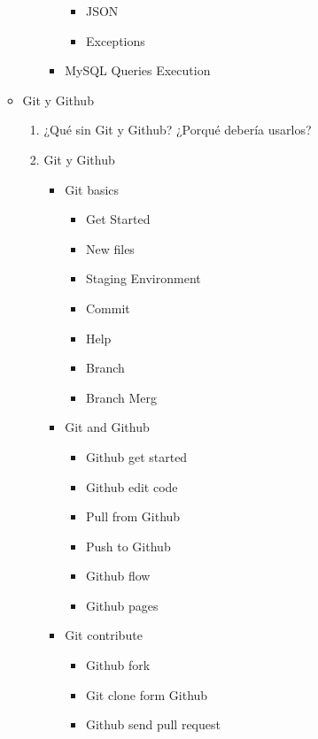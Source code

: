 \documentclass[12pt, letterpaper]{article}
\begin{document}
\begin{enumerate}
\begin{itemize}
\begin{enumerate}
\begin{itemize}
\begin{itemize}
                    \item JSON
                    \item Exceptions
                \end{itemize}
                \item MySQL Queries Execution
            \end{itemize}
        \end{enumerate}
        \item Git y Github
        \begin{enumerate}
            \item ¿Qué sin Git y Github? ¿Porqué debería usarlos?
            \item Git y Github
            \begin{itemize}
                \item Git basics
                \begin{itemize}
                    \item Get Started
                    \item New files
                    \item Staging Environment
                    \item Commit
                    \item Help
                    \item Branch
                    \item Branch Merg
                \end{itemize}
                \item Git and Github
                \begin{itemize}
                    \item Github get started
                    \item Github edit code
                    \item Pull from Github
                    \item Push to Github
                    \item Github flow
                    \item Github pages
                \end{itemize}
                \item Git contribute
                \begin{itemize}
                    \item Github fork
                    \item Git clone form Github
                    \item Github send pull request

\end{itemize}
\end{itemize}
\end{enumerate}
\end{itemize}
\end{enumerate}
\end{document}
